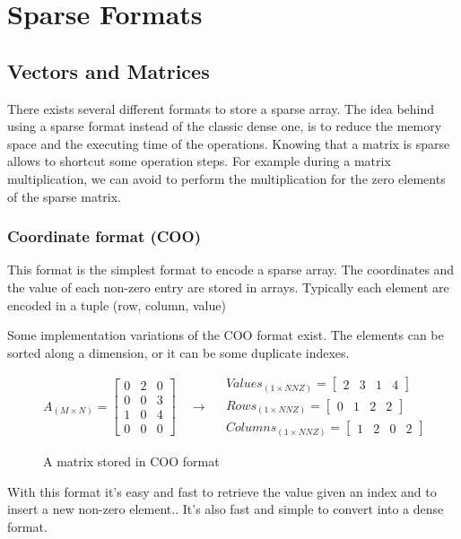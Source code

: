 \chapter{Sparse Formats}

\section{Vectors and Matrices}


There exists several different formats to store a sparse array. The idea behind using a sparse format instead of the classic dense one, is to reduce the memory space and the executing time of the operations. Knowing that a matrix is sparse allows to shortcut some operation steps. For example during a matrix multiplication, we can avoid to perform the multiplication for the zero elements of the sparse matrix.

\subsection{Coordinate format (COO)}

This format is the simplest format to encode a sparse array. The coordinates and the value of each non-zero entry are stored in arrays.
Typically each element are encoded in a tuple (row, column, value)

Some implementation variations of the COO format exist. The elements can be sorted along a dimension, or it can be some duplicate indexes.

\begin{figure}[h]
\[
A_{(M\times N)} = 
\begin{bmatrix}
0 &  2 & 0 \\
0 &  0 & 3 \\
1 &  0 & 4\\
0 &  0 & 0
\end{bmatrix}
\quad\rightarrow\quad
\begin{aligned}
Values_{(1\times NNZ)} = 
\begin{bmatrix}
2 &  3 & 1 & 4
\end{bmatrix}
\\
Rows_{(1\times NNZ)} = 
\begin{bmatrix}
0 &  1 & 2 & 2
\end{bmatrix}
\\
Columns_{(1\times NNZ)} = 
\begin{bmatrix}
1 &  2 & 0 & 2
\end{bmatrix}
\end{aligned}
\]
\caption{A matrix stored in COO format}
\end{figure}
With this format it's easy and fast to retrieve the value given an index and to insert a new non-zero element.. It's also fast and simple to convert into a dense format.

